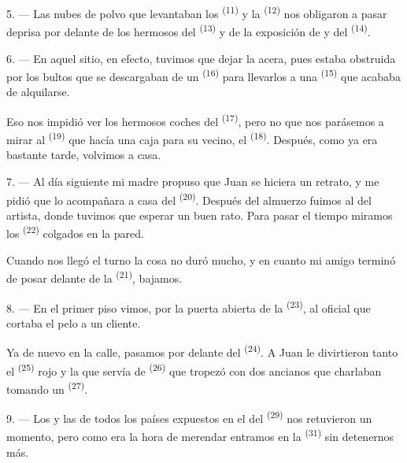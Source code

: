 5. --- Las nubes de polvo que levantaban los 
\textsuperscript{(11)} y la  \textsuperscript{(12)} nos obligaron a pasar
deprisa por delante de los hermosos  del
 \textsuperscript{(13)} y de la exposición de  y
 del  \textsuperscript{(14)}.

6. --- En aquel sitio, en efecto, tuvimos que dejar la acera, pues estaba
obstruida por los bultos que se descargaban de un 
\textsuperscript{(16)} para llevarlos a una  \textsuperscript{(15)} que acababa
de alquilarse.

Eso nos impidió ver los hermosos coches del 
\textsuperscript{(17)}, pero no que nos parásemos a mirar al 
\textsuperscript{(19)} que hacía una caja para su vecino, el
 \textsuperscript{(18)}. Después, como
ya era bastante tarde, volvimos a casa.

\VUsaut{3.0mm}

7. --- Al día siguiente mi madre propuso que Juan se hiciera un retrato, y
me pidió que lo acompañara a casa del  \textsuperscript{(20)}.
Después del almuerzo fuimos al  del artista, donde tuvimos
que esperar un buen rato. Para pasar el tiempo miramos los
 \textsuperscript{(22)} colgados en la pared.

Cuando nos llegó el turno la cosa no duró mucho, y en cuanto mi amigo
terminó de posar delante de la  \textsuperscript{(21)}, bajamos.

8. --- En el primer piso vimos, por la puerta abierta de la
 \textsuperscript{(23)}, al oficial que cortaba el pelo a un
cliente.

Ya de nuevo en la calle, pasamos por delante del 
\textsuperscript{(24)}. A Juan le divirtieron tanto el  \textsuperscript{(25)}
rojo y la  que servía de  \textsuperscript{(26)} que
tropezó con dos ancianos que charlaban tomando un 
\textsuperscript{(27)}.

\VUsaut{3.0mm}

9. --- Los  y las  de todos los países
expuestos en el  del  \textsuperscript{(29)} nos
retuvieron un momento, pero como era la hora de merendar entramos en la
 \textsuperscript{(31)} sin detenernos más.


